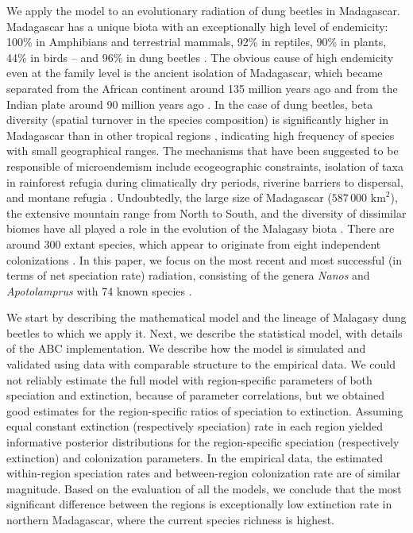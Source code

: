 We apply the model to an evolutionary radiation of dung beetles in Madagascar. Madagascar has a unique biota \citep{Myers2000} with an exceptionally high level of endemicity: 100\% in Amphibians and terrestrial mammals, 92\% in reptiles, 90\% in plants, 44\% in birds \citep{Goodman2003} – and 96\% in dung beetles \citep{Miraldo2011}. 
The obvious cause of high endemicity even at the family level \citep{Vences2009} is the ancient isolation of Madagascar, which became separated from the African continent around 135 million years ago and from the Indian plate around 90 million years ago \citep{deWit2003}. 
In the case of dung beetles, beta diversity (spatial turnover in the species composition) is significantly higher in Madagascar than in other tropical regions \citep{Viljanen2010}, indicating high frequency of species with small geographical ranges. 
The mechanisms that have been suggested to be responsible of microendemism include ecogeographic constraints, isolation of taxa in rainforest refugia during climatically dry periods, riverine barriers to dispersal, and montane refugia \citep{Vences2009}. 
Undoubtedly, the large size of Madagascar ($587 \,000 \mbox{ km}^2$), the extensive mountain range from North to South, and the diversity of dissimilar biomes have all played a role in the evolution of the Malagasy biota \citep{Wilme2006, Yoder2006, Vences2009}. 
There are around 300 extant species, which appear to originate from eight independent colonizations \citep{Wirta2010, Miraldo2011}. 
In this paper, we focus on the most recent and most successful (in terms of net speciation rate) radiation, consisting of the genera \textit{Nanos} and \textit{Apotolamprus} with 74 known species \citep{Miraldo2011, Miraldo2014}.

We start by describing the mathematical model and the lineage of Malagasy dung beetles to which we apply it. 
Next, we describe the statistical model, with details of the ABC implementation. We describe how the model is simulated and validated using data with comparable structure to the empirical data. We could not reliably estimate the full model with region-specific parameters of both speciation and extinction, because of parameter correlations, but we obtained good estimates for the region-specific ratios of speciation to extinction. 
Assuming equal constant extinction (respectively speciation) rate in each region yielded informative posterior distributions for the region-specific speciation (respectively extinction) and colonization parameters. 
In the empirical data, the estimated within-region speciation rates and between-region colonization rate are of similar magnitude.  
Based on the evaluation of all the models, we conclude that the most significant difference between the regions is exceptionally low extinction rate in northern Madagascar, where the current species richness is highest. 
